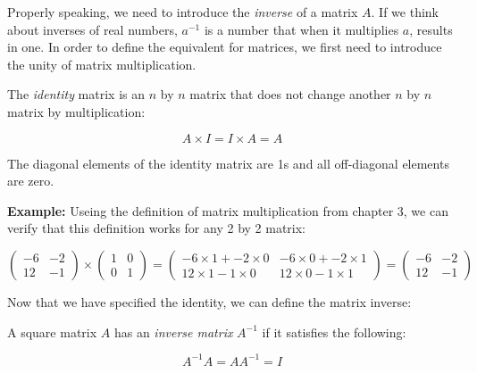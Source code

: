 \documentclass[
  letterpaper,
  DIV=11,
  numbers=noendperiod]{scrreprt}
\begin{document}
Properly speaking, we need to introduce the \emph{inverse} of a matrix
\(A\). If we think about inverses of real numbers, \(a^{-1}\) is a
number that when it multiplies \(a\), results in one. In order to define
the equivalent for matrices, we first need to introduce the unity of
matrix multiplication.

\begin{tcolorbox}[enhanced jigsaw, colbacktitle=quarto-callout-note-color!10!white, leftrule=.75mm, coltitle=black, left=2mm, breakable, opacityback=0, colback=white, toprule=.15mm, opacitybacktitle=0.6, bottomtitle=1mm, colframe=quarto-callout-note-color-frame, rightrule=.15mm, bottomrule=.15mm, toptitle=1mm, titlerule=0mm, arc=.35mm, title=\textcolor{quarto-callout-note-color}{\faInfo}\hspace{0.5em}{Definition}]
The \emph{identity} matrix is an \(n\) by \(n\) matrix that does not
change another \(n\) by \(n\) matrix by multiplication:

\[
A \times I = I \times A  = A
\]

The diagonal elements of the identity matrix are 1s and all off-diagonal
elements are zero.
\end{tcolorbox}

\textbf{Example:} Useing the definition of matrix multiplication from
chapter 3, we can verify that this definition works for any 2 by 2
matrix:

\[
\begin{pmatrix}-6 & -2 \\ 12 & -1 \end{pmatrix} \times \begin{pmatrix} 1 & 0 \\ 0 & 1\end{pmatrix} = 
\begin{pmatrix}-6\times 1 + -2\times 0 & -6\times 0 + -2\times 1  \\ 12\times 1 -1 \times 0 & 12\times 0 -1 \times 1  \end{pmatrix} = \begin{pmatrix}-6 & -2 \\ 12 & -1 \end{pmatrix}
\]

Now that we have specified the identity, we can define the matrix
inverse:

\begin{tcolorbox}[enhanced jigsaw, colbacktitle=quarto-callout-note-color!10!white, leftrule=.75mm, coltitle=black, left=2mm, breakable, opacityback=0, colback=white, toprule=.15mm, opacitybacktitle=0.6, bottomtitle=1mm, colframe=quarto-callout-note-color-frame, rightrule=.15mm, bottomrule=.15mm, toptitle=1mm, titlerule=0mm, arc=.35mm, title=\textcolor{quarto-callout-note-color}{\faInfo}\hspace{0.5em}{Definition}]
A square matrix \(A\) has an \emph{inverse matrix} \(A^{-1}\) if it
satisfies the following:

\[
A^{-1} A = A A^{-1} = I
\]
\end{tcolorbox}
\end{document}
